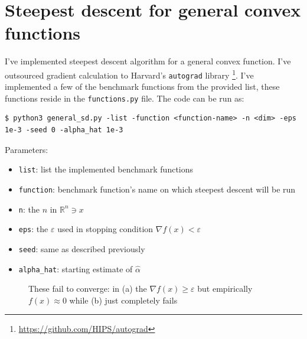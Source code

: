 \documentclass[11pt]{article}
\begin{document}
\section{Steepest descent for general convex functions}
I've implemented steepest descent algorithm for a general convex function. I've
outsourced gradient calculation to Harvard's \verb|autograd| library%
\footnote[1]{\url{https://github.com/HIPS/autograd}}. I've implemented
a few of the benchmark functions from the provided list, these functions reside
in the \verb|functions.py| file. The code can be run as:
\begin{verbatim}
$ python3 general_sd.py -list -function <function-name> -n <dim> -eps 1e-3 -seed 0 -alpha_hat 1e-3
\end{verbatim}
Parameters:
\begin{itemize}
    \item \verb|list|: list the implemented benchmark functions
    \item \verb|function|: benchmark function's name on which steepest descent will be run
    \item \verb|n|: the $n$ in $\mathbb{R}^n\ni x$
    \item \verb|eps|: the $\varepsilon$ used in stopping condition $\nabla f(x)<\varepsilon$
    \item \verb|seed|: same as described previously
    \item \verb|alpha_hat|: starting estimate of $\hat{\alpha}$
\end{itemize}
\begin{figure}
    \caption{These fail to converge: in (a) the $\nabla f(x)\ge \varepsilon$ but empirically 
    $f(x)\approx 0$ while (b) just completely fails}
\end{figure}
\end{document}
